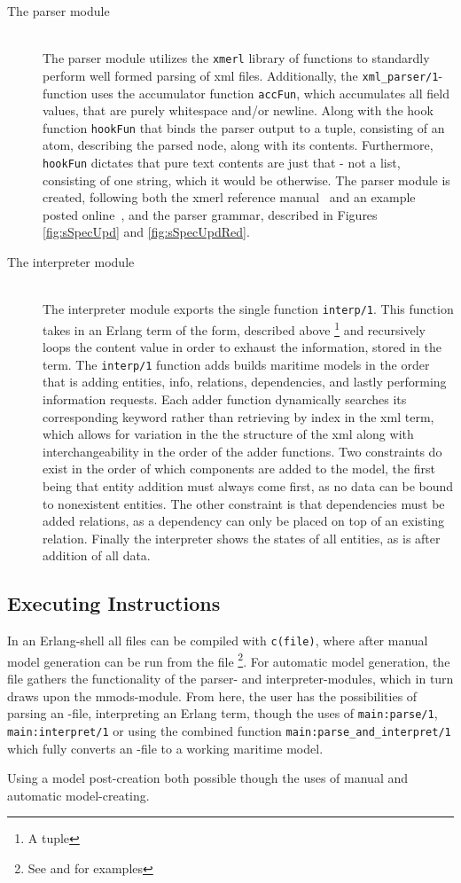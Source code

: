 \begin{description}
	\item[The parser module]\ \\
		The parser module utilizes the \lstinline{xmerl} library of functions to standardly perform well formed parsing of xml files. Additionally, the \lstinline{xml_parser/1}-function uses the accumulator function \lstinline{accFun}, which accumulates all field values, that are  purely whitespace and/or newline. Along with the hook function \lstinline{hookFun} that binds the parser output to a tuple, consisting of an atom, describing the parsed node, along with its contents. Furthermore, \lstinline{hookFun} dictates that pure text contents are just that - not a list, consisting of one string, which it would be otherwise. The parser module is created, following both the xmerl reference manual~\cite{xmerl} and an example posted online~\cite{xmerlEx}, and the parser grammar, described in Figures \ref{fig:sSpecUpd} and \ref{fig:sSpecUpdRed}.
	\item[The interpreter module]\ \\
		The interpreter module exports the single function \lstinline{interp/1}. This function takes in an Erlang term of the form, described above \footnote{A tuple} and recursively loops the content value in order to exhaust the information, stored in the term. The \lstinline{interp/1} function adds builds maritime models in the order that is adding entities, info, relations, dependencies, and lastly performing information requests. Each adder function dynamically searches its corresponding keyword rather than retrieving by index in the xml term, which allows for variation in the the structure of the xml along with interchangeability in the order of the adder functions. Two constraints do exist in the order of which components are added to the model, the first being that entity addition must always come first, as no data can be bound to nonexistent entities. The other constraint is that dependencies must be added  relations, as a dependency can only be placed on top of an existing relation. Finally the interpreter shows the states of all entities, as is after addition of all data.
\end{description}
\subsection{Executing Instructions}
In an Erlang-shell all files can be compiled with \lstinline{c(file)}, where after manual model generation can be run from the  file \footnote{See  and  for examples}.
For automatic model generation, the  file gathers the functionality of the parser- and interpreter-modules, which in turn draws upon the mmods-module. From here, the user has the possibilities of parsing an -file, interpreting an Erlang term, though the uses of \lstinline{main:parse/1}, \lstinline{main:interpret/1} or using the combined function \lstinline{main:parse_and_interpret/1} which fully converts an -file to a working maritime model.

Using a model post-creation both possible though the uses of manual and automatic model-creating. 
